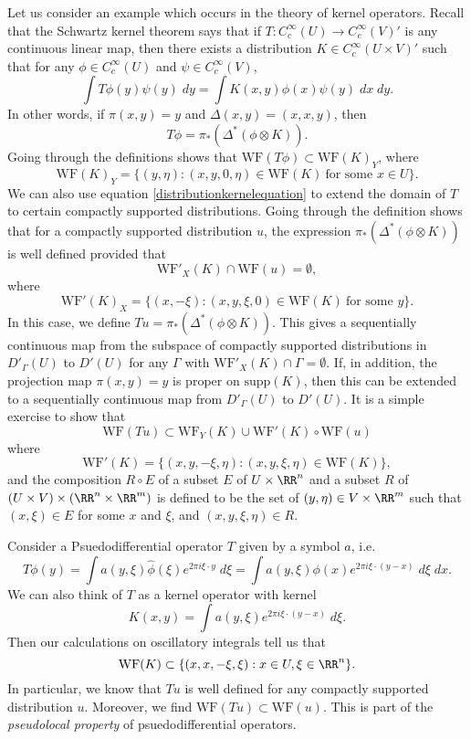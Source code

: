 Let us consider an example which occurs in the theory of kernel operators. Recall that the Schwartz kernel theorem says that if $T: C_c^\infty(U) \to C_c^\infty(V)'$ is any continuous linear map, then there exists a distribution $K \in C_c^\infty(U \times V)'$ such that for any $\phi \in C_c^\infty(U)$ and $\psi \in C_c^\infty(V)$,
%
\[ \int T\phi(y) \psi(y)\; dy = \int K(x,y) \phi(x) \psi(y)\; dx\; dy. \]
%
In other words, if $\pi(x,y) = y$ and $\Delta(x,y) = (x,x,y)$, then
%
\begin{equation} \label{distributionkernelequation}
    T\phi = \pi_*(\Delta^* (\phi \otimes K)).
\end{equation}
%
Going through the definitions shows that $\text{WF}(T\phi) \subset \text{WF}(K)_Y$, where
%
\[ \text{WF}(K)_Y = \{ (y,\eta) : (x,y,0,\eta) \in \text{WF}(K)\ \text{for some $x \in U$} \}. \]
%
We can also use equation \eqref{distributionkernelequation} to extend the domain of $T$ to certain compactly supported distributions. Going through the definition shows that for a compactly supported distribution $u$, the expression $\pi_*(\Delta^*(\phi \otimes K))$ is well defined provided that
%
\[ \text{WF}'_X(K) \cap \text{WF}(u) = \emptyset, \]
%
where
%
\[ \text{WF}'(K)_X = \{ (x,-\xi) : (x,y,\xi,0) \in \text{WF}(K)\ \text{for some $y$} \}. \]
%
In this case, we define $Tu = \pi_*(\Delta^*(\phi \otimes K))$. This gives a sequentially continuous map from the subspace of compactly supported distributions in $D'_\Gamma(U)$ to $D'(U)$ for any $\Gamma$ with $\text{WF}'_X(K) \cap \Gamma = \emptyset$. If, in addition, the projection map $\pi(x,y) = y$ is proper on $\text{supp}(K)$, then this can be extended to a sequentially continuous map from $D'_\Gamma(U)$ to $D'(U)$. It is a simple exercise to show that
%
\[ \text{WF}(Tu) \subset \text{WF}_Y(K) \cup \text{WF}'(K) \circ \text{WF}(u) \]
%
where
%
\[ \text{WF}'(K) = \{ (x,y,-\xi,\eta) : (x,y,\xi,\eta) \in \text{WF}(K) \}, \]
%
and the composition $R \circ E$ of a subset $E$ of $U \times \RR^n$ and a subset $R$ of $(U \times V) \times (\RR^n \times \RR^m)$ is defined to be the set of $(y,\eta) \in V \times \RR^m$ such that $(x,\xi) \in E$ for some $x$ and $\xi$, and $(x,y,\xi,\eta) \in R$.

\begin{example}
    Consider a Psuedodifferential operator $T$ given by a symbol $a$, i.e.
    \[ T\phi(y) = \int a(y,\xi) \widehat{\phi}(\xi) e^{2 \pi i \xi \cdot y}\; d\xi = \int a(y,\xi) \phi(x) e^{2 \pi i \xi \cdot (y - x)}\; d\xi\; dx. \]
    We can also think of $T$ as a kernel operator with kernel
    \[ K(x,y) = \int a(y,\xi) e^{2 \pi i \xi \cdot (y - x)} \; d\xi. \]
    Then our calculations on oscillatory integrals tell us that
    \[ \text{WF}(K) \subset \{ (x,x,-\xi,\xi) : x \in U, \xi \in \RR^n \}. \]
    In particular, we know that $Tu$ is well defined for any compactly supported distribution $u$. Moreover, we find $\text{WF}(Tu) \subset \text{WF}(u)$. This is part of the \emph{pseudolocal property} of psuedodifferential operators.
\end{example}

